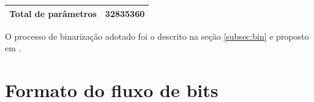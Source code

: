 \begin{table}[htbp]
\begin{tabular}{|c|c|c|c|c|c|c|}
		\multicolumn{6}{|c|}{Total de parâmetros}                                                                                                                                                                                                                                                          & 32835360                                                                \\ \hline
	\end{tabular}\quad
	\label{table:aerc}
\end{table}


O processo de binarização adotado foi o descrito na seção \ref{subsec:bin} e proposto em \cite{Variable2016Toderici}.














\section{Formato do fluxo de bits}

